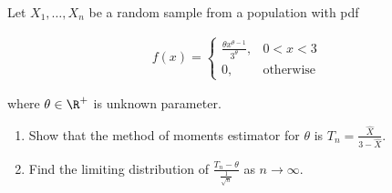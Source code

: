 
\begin{exercise}

Let $X_1, \dots, X_n$ be a random sample from a population with pdf

\begin{align*}
    f(x)
    =
    \begin{cases}
        \frac{\theta x^{\theta - 1}}{3^\theta},
        & 0 < x < 3 \\
        0,
        & \text{otherwise}
    \end{cases}
\end{align*}

where $\theta \in \R^+$ is unknown parameter.

\begin{enumerate}[label = (\alph*)]
    \item Show that the method of moments estimator for $\theta$ is $T_n = \frac{\hat X}{3 - \hat X}$.
    \item Find the limiting distribution of $\frac{T_n - \theta}{\frac{1}{\sqrt n}}$ as $n \to \infty$.
\end{enumerate}

\end{exercise}


